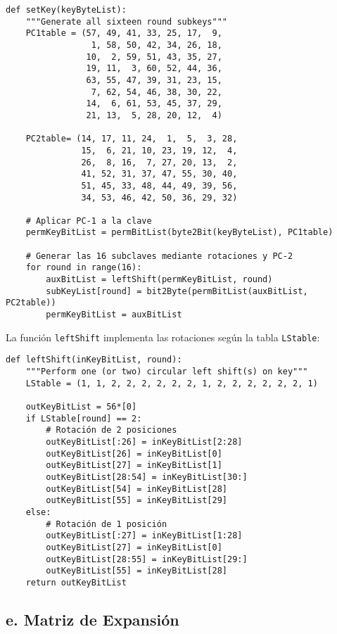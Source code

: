 \begin{lstlisting}[style=cryptoalgo]
def setKey(keyByteList):
    """Generate all sixteen round subkeys"""
    PC1table = (57, 49, 41, 33, 25, 17,  9,
                 1, 58, 50, 42, 34, 26, 18,
                10,  2, 59, 51, 43, 35, 27,
                19, 11,  3, 60, 52, 44, 36,
                63, 55, 47, 39, 31, 23, 15,
                 7, 62, 54, 46, 38, 30, 22,
                14,  6, 61, 53, 45, 37, 29,
                21, 13,  5, 28, 20, 12,  4)

    PC2table= (14, 17, 11, 24,  1,  5,  3, 28,
               15,  6, 21, 10, 23, 19, 12,  4,
               26,  8, 16,  7, 27, 20, 13,  2,
               41, 52, 31, 37, 47, 55, 30, 40,
               51, 45, 33, 48, 44, 49, 39, 56,
               34, 53, 46, 42, 50, 36, 29, 32)

    # Aplicar PC-1 a la clave
    permKeyBitList = permBitList(byte2Bit(keyByteList), PC1table)
    
    # Generar las 16 subclaves mediante rotaciones y PC-2
    for round in range(16):
        auxBitList = leftShift(permKeyBitList, round)
        subKeyList[round] = bit2Byte(permBitList(auxBitList, PC2table))
        permKeyBitList = auxBitList
\end{lstlisting}

La función \texttt{leftShift} implementa las rotaciones según la tabla \texttt{LStable}:

\begin{lstlisting}[style=cryptoalgo]
def leftShift(inKeyBitList, round):
    """Perform one (or two) circular left shift(s) on key"""
    LStable = (1, 1, 2, 2, 2, 2, 2, 2, 1, 2, 2, 2, 2, 2, 2, 1)
    
    outKeyBitList = 56*[0]
    if LStable[round] == 2:
        # Rotación de 2 posiciones
        outKeyBitList[:26] = inKeyBitList[2:28]
        outKeyBitList[26] = inKeyBitList[0]
        outKeyBitList[27] = inKeyBitList[1]
        outKeyBitList[28:54] = inKeyBitList[30:]
        outKeyBitList[54] = inKeyBitList[28]
        outKeyBitList[55] = inKeyBitList[29]
    else:
        # Rotación de 1 posición
        outKeyBitList[:27] = inKeyBitList[1:28]
        outKeyBitList[27] = inKeyBitList[0]
        outKeyBitList[28:55] = inKeyBitList[29:]
        outKeyBitList[55] = inKeyBitList[28]
    return outKeyBitList
\end{lstlisting}

\subsection{e. Matriz de Expansión}


